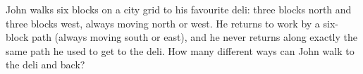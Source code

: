 John walks six blocks on a city grid to his favourite deli: three blocks north and three blocks west, always moving north or west. He returns to work by a six-block path (always moving south or east), and he never returns along exactly the same path he used to get to the deli. How many different ways can John walk to the deli and back?
